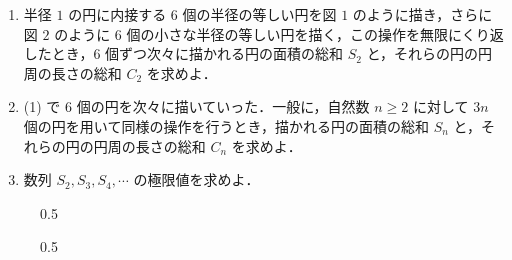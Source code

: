 \documentclass[../../main.tex]{subfiles}
\begin{document}
\begin{enumerate}
  \item 半径 $1$ の円に内接する $6$ 個の半径の等しい円を図 $1$ のように描き，さらに図 $2$ のように $6$ 個の小さな半径の等しい円を描く，この操作を無限にくり返したとき，$6$ 個ずつ次々に描かれる円の面積の総和 $S_2$ と，それらの円の円周の長さの総和 $C_2$ を求めよ．
  \item (1) で $6$ 個の円を次々に描いていった．一般に，自然数 $n \ge 2$ に対して $3n$ 個の円を用いて同様の操作を行うとき，描かれる円の面積の総和 $S_n$ と，それらの円の円周の長さの総和 $C_n$ を求めよ．
  \item 数列 $S_2, S_3, S_4, \cdots$ の極限値を求めよ．
\end{enumerate}

\begin{figure}[H]
  \centering
  \begin{subcaptionblock}{0.5\linewidth}
    \centering
  \end{subcaptionblock}\hfill
  \begin{subcaptionblock}{0.5\linewidth}
    \centering
  \end{subcaptionblock}\hfill
\end{figure}
\end{document}
